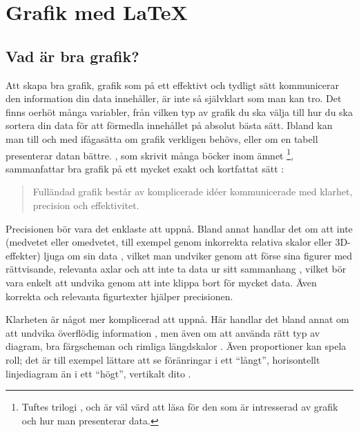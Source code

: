 \documentclass[lang=sv,ptsize=10pt,font=none,nomath,titles=bf,../../a4.tex]{subfiles}
\begin{document}
\section{Grafik med \LaTeX}\label{sec:4}

\subsection{Vad är bra grafik?}
Att skapa bra grafik, grafik som på ett effektivt och tydligt sätt
kommunicerar den information din data innehåller, är inte så självklart
som man kan tro. Det finns oerhöt många variabler, från vilken typ av
grafik du ska välja \parencite{Henry12} till hur du ska sortera din
data \parencites{Camoes10}[\pno~178]{Tufte01} för att förmedla innehållet
på absolut bästa sätt. Ibland kan man till och med ifågasätta om grafik
verkligen behövs, eller om en tabell presenterar datan bättre.
, som skrivit många böcker inom ämnet%
\footnote{Tuftes trilogi \emph{} \parencite{Tufte01},
	\emph{} \parencite{Tufte90} och
	\emph{} \parencite{Tufte97} är väl värd att läsa
	för den som är intresserad av grafik och hur man presenterar data.},
sammanfattar bra grafik på ett mycket exakt och kortfattat sätt
\textcite[\pno~51]{Tufte01}:
\begin{quotation}
	Fulländad grafik består av komplicerade idéer kommunicerade med
	klarhet, precision och effektivitet.
\end{quotation}

Precisionen bör vara det enklaste att uppnå. 
Bland annat handlar det om att inte (medvetet eller omedvetet, till
exempel genom inkorrekta relativa skalor eller 3D-effekter)
ljuga om sin data \parencite[\ppno~57\psqq]{Tufte01},
vilket man undviker genom att förse sina figurer med rättvisande,
relevanta axlar och att inte ta data ur sitt sammanhang
\parencite[\ppno~75\psq]{Tufte01}, vilket bör vara enkelt att undvika
genom att inte klippa bort för mycket data.
Även korrekta och relevanta figurtexter hjälper precisionen.

Klarheten är något mer komplicerad att uppnå. Här handlar det bland annat
om att undvika överflödig information , men även om att
använda rätt typ av diagram, bra färgscheman
\parencite[\ppno~75–77]{Tufte97} och rimliga längdskalor
\parencite[\ppno~20–23]{Tufte97}. Även proportioner kan spela roll;
det är till exempel lättare att se föränringar i ett \enquote{långt},
horisontellt linjediagram än i ett \enquote{högt}, vertikalt dito
\parencite[\ppno~186\psq]{Tufte01}.
\end{document}
